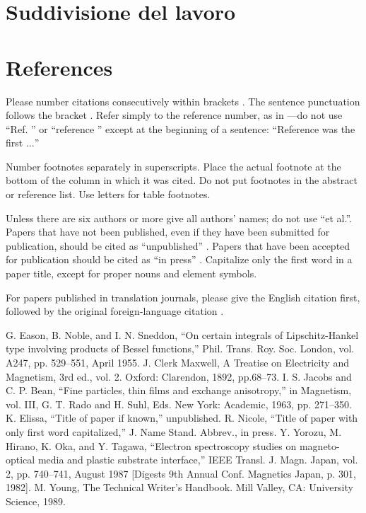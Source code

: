 \documentclass[conference]{IEEEtran}
\begin{document}
\section{Suddivisione del lavoro}
\section*{References}

Please number citations consecutively within brackets \cite{b1}. The 
sentence punctuation follows the bracket \cite{b2}. Refer simply to the reference 
number, as in \cite{b3}---do not use ``Ref. \cite{b3}'' or ``reference \cite{b3}'' except at 
the beginning of a sentence: ``Reference \cite{b3} was the first $\ldots$''

Number footnotes separately in superscripts. Place the actual footnote at 
the bottom of the column in which it was cited. Do not put footnotes in the 
abstract or reference list. Use letters for table footnotes.

Unless there are six authors or more give all authors' names; do not use 
``et al.''. Papers that have not been published, even if they have been 
submitted for publication, should be cited as ``unpublished'' \cite{b4}. Papers 
that have been accepted for publication should be cited as ``in press'' \cite{b5}. 
Capitalize only the first word in a paper title, except for proper nouns and 
element symbols.

For papers published in translation journals, please give the English 
citation first, followed by the original foreign-language citation \cite{b6}.

\begin{thebibliography}{00}
 G. Eason, B. Noble, and I. N. Sneddon, ``On certain integrals of Lipschitz-Hankel type involving products of Bessel functions,'' Phil. Trans. Roy. Soc. London, vol. A247, pp. 529--551, April 1955.
 J. Clerk Maxwell, A Treatise on Electricity and Magnetism, 3rd ed., vol. 2. Oxford: Clarendon, 1892, pp.68--73.
 I. S. Jacobs and C. P. Bean, ``Fine particles, thin films and exchange anisotropy,'' in Magnetism, vol. III, G. T. Rado and H. Suhl, Eds. New York: Academic, 1963, pp. 271--350.
 K. Elissa, ``Title of paper if known,'' unpublished.
 R. Nicole, ``Title of paper with only first word capitalized,'' J. Name Stand. Abbrev., in press.
 Y. Yorozu, M. Hirano, K. Oka, and Y. Tagawa, ``Electron spectroscopy studies on magneto-optical media and plastic substrate interface,'' IEEE Transl. J. Magn. Japan, vol. 2, pp. 740--741, August 1987 [Digests 9th Annual Conf. Magnetics Japan, p. 301, 1982].
 M. Young, The Technical Writer's Handbook. Mill Valley, CA: University Science, 1989.
\end{thebibliography}
\vspace{12pt}
\end{document}
